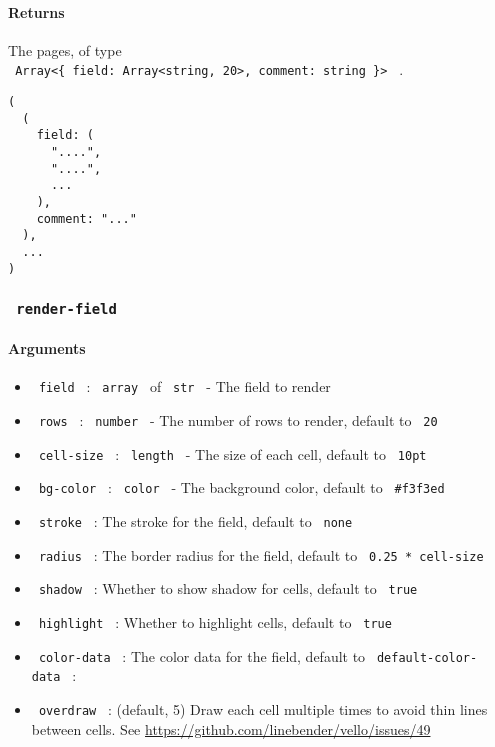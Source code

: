\paragraph{Returns}\label{returns}

The pages, of type
\texttt{\ Array\textless{}\{\ field:\ Array\textless{}string,\ 20\textgreater{},\ comment:\ string\ \}\textgreater{}\ }
.

\begin{verbatim}
(
  (
    field: (
      "....",
      "....",
      ...
    ),
    comment: "..."
  ),
  ...
)
\end{verbatim}

\subsubsection{\texorpdfstring{\texttt{\ render-field\ }}{ render-field }}\label{render-field}

\paragraph{Arguments}\label{arguments-1}

\begin{itemize}
\tightlist
\item
  \texttt{\ field\ } : \texttt{\ array\ } of \texttt{\ str\ } - The
  field to render
\item
  \texttt{\ rows\ } : \texttt{\ number\ } - The number of rows to
  render, default to \texttt{\ 20\ }
\item
  \texttt{\ cell-size\ } : \texttt{\ length\ } - The size of each cell,
  default to \texttt{\ 10pt\ }
\item
  \texttt{\ bg-color\ } : \texttt{\ color\ } - The background color,
  default to \texttt{\ \#f3f3ed\ }
\item
  \texttt{\ stroke\ } : The stroke for the field, default to
  \texttt{\ none\ }
\item
  \texttt{\ radius\ } : The border radius for the field, default to
  \texttt{\ 0.25\ *\ cell-size\ }
\item
  \texttt{\ shadow\ } : Whether to show shadow for cells, default to
  \texttt{\ true\ }
\item
  \texttt{\ highlight\ } : Whether to highlight cells, default to
  \texttt{\ true\ }
\item
  \texttt{\ color-data\ } : The color data for the field, default to
  \texttt{\ default-color-data\ } :
\item
  \texttt{\ overdraw\ } : (default, 5) Draw each cell multiple times to
  avoid thin lines between cells. See
  \url{https://github.com/linebender/vello/issues/49}
\end{itemize}

